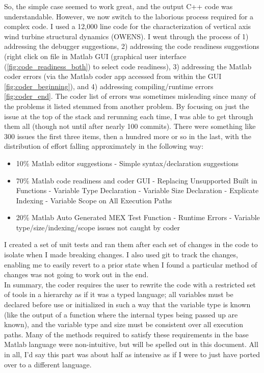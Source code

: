 \documentclass{article}
\begin{document}
So, the simple case seemed to work great, and the output C++ code was understandable.  However, we now switch to the laborious process required for a complex code.  I used a 12,000 line code for the characterization of vertical axis wind turbine structural dynamics (OWENS).  I went through the process of 1) addressing the debugger suggestions, 2) addressing the code readiness suggestions (right click on file in Matlab GUI (graphical user interface (\cref{fig:code_readiness_both}) to select code readiness), 3) addressing the Matlab coder errors (via the Matlab coder app accessed from within the GUI \cref{fig:coder_beginning}), and 4) addressing compiling/runtime errors \cref{fig:coder_end}.  The coder list of errors was sometimes misleading since many of the problems it listed stemmed from another problem.  By focusing on just the issue at the top of the stack and rerunning each time, I was able to get through them all (though not until after nearly 100 commits).  There were something like 300 issues the first three items, then a hundred more or so in the last, with the distribution of effort falling approximately in the following way:

\begin{itemize}

  \item 10\% Matlab editor suggestions
	  \subitem - Simple syntax/declaration suggestions
  \item 70\% Matlab code readiness and coder GUI
	  \subitem - Replacing Unsupported Built in Functions
	  \subitem - Variable Type Declaration
	  \subitem - Variable Size Declaration
	  \subitem - Explicate Indexing
	  \subitem - Variable Scope on All Execution Paths
  \item 20\% Matlab Auto Generated MEX Test Function - Runtime Errors
	  \subitem - Variable type/size/indexing/scope issues not caught by coder

\end{itemize}

I created a set of unit tests and ran them after each set of changes in the code to isolate when I made breaking changes. I also used git to track the changes, enabling me to easily revert to a prior state when I found a particular method of changes was not going to work out in the end. \\

In summary, the coder requires the user to rewrite the code with a restricted set of tools in a hierarchy as if it was a typed language; all variables must be declared before use or initialized in such a way that the variable type is known (like the output of a function where the internal types being passed up are known), and the variable type and size must be consistent over all execution paths.  Many of the methods required to satisfy these requirements in the base Matlab language were non-intuitive, but will be spelled out in this document.  All in all, I'd say this part was about half as intensive as if I were to just have ported over to a different language.
\end{document}
